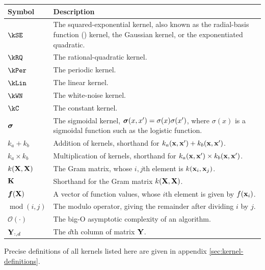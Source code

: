 \begin{tabular}{lm{12cm}}
Symbol \quad     & Description \\
\hline
$\kSE$ & The squared-exponential kernel, also known as the radial-basis function (\RBF{}) kernel, the Gaussian kernel, or the exponentiated quadratic. \\
$\kRQ$ & The rational-quadratic kernel. \\
$\kPer$ & The periodic kernel. \\
$\kLin$ & The linear kernel. \\
$\kWN$ & The white-noise kernel. \\
$\kC$ & The constant kernel. \\
${\boldsymbol{\sigma}}$ & The sigmoidal kernel, ${\boldsymbol{\sigma}}(x, x') = \sigma(x) \sigma(x')$, where $\sigma(x)$ is a sigmoidal function such as the logistic function. \\
$k_a + k_b$ & Addition of kernels, shorthand for $k_a({\bf{x}}, {\bf{x}}') + k_b({\bf{x}}, {\bf{x}}')$. \\
$k_a \times k_b$& Multiplication of kernels, shorthand for $k_a({\bf{x}}, {\bf{x}}') \times k_b({\bf{x}}, {\bf{x}}')$. \\
$k(\mathbf{X}, \mathbf{X})$ & The Gram matrix, whose $i,j$th element is $k({\bf{x}}_i, {\bf{x}}_j)$. \\
$\mathbf{K}$ & Shorthand for the Gram matrix $k(\mathbf{X}, \mathbf{X})$. \\
$\boldsymbol{f}(\mathbf{X})$ & A vector of function values, whose $i$th element is given by $f({\bf{x}}_i)$. \\
$\operatorname{mod}(i,j)$ & The modulo operator, giving the remainder after dividing $i$ by $j$. \\
$\mathcal{O}(\cdot)$ & The big-O asymptotic complexity of an algorithm. \\
$\mathbf{Y}_{:,d}$ & The $d$th column of matrix $\mathbf{Y}$.
\end{tabular}

\vspace{1cm}
Precise definitions of all kernels listed here are given in appendix \ref{sec:kernel-definitions}.


\outbpdocument{
}


